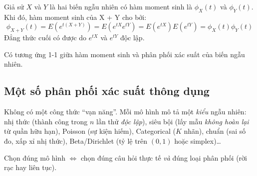 \documentclass[12pt,a4paper]{article}
\begin{document}
\begin{luuy}
  Giả sử $X$ và $Y$ là hai biến ngẫu nhiên có hàm moment sinh là $\phi_X(t)$ và $\phi_Y(t)$. Khi đó, hàm moment sinh của X + Y cho bởi:
  \[
    \phi_{X+Y}(t) = E(e^{t(X+Y)}) = E(e^{tX}e^{tY}) = E(e^{tX})E(e^{tY}) = \phi_X(t) \phi_Y(t)
  \]
  Đẳng thức cuối có được do $e^{tX}$ và $e^{tY}$ độc lập.

  Có tương ứng 1-1 giữa hàm moment sinh và phân phối xác suất của biến ngẫu nhiên.
\end{luuy}

\subsection{Một số phân phối xác suất thông dụng}

\begin{dongco}
Không có một công thức ``vạn năng''. Mỗi mô hình mô tả một \emph{kiểu} ngẫu nhiên: nhị thức (thành công trong $n$ lần thử \emph{độc lập}), siêu bội (lấy mẫu \emph{không hoàn lại} từ quần hữu hạn), Poisson (sự kiện hiếm), Categorical ($K$ nhãn), chuẩn (sai số đo, xấp xỉ nhị thức), Beta/Dirichlet (tỷ lệ trên $(0,1)$ hoặc simplex)\ldots

Chọn đúng mô hình $\Leftrightarrow$ chọn đúng câu hỏi thực tế \emph{và} đúng loại phân phối (rời rạc hay liên tục).
\end{dongco}
\end{document}
